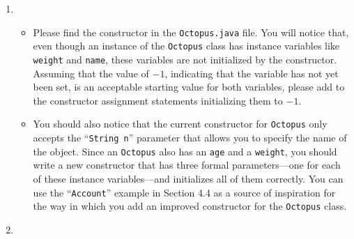 \begin{enumerate}
\item

\begin{itemize}


  \item Please find the constructor in the {\tt Octopus.java} file.  You will notice that, even though an
    instance of the {\tt Octopus} class has instance variables like {\tt weight} and {\tt name}, these variables are not
    initialized by the constructor. Assuming that the value of $-1$, indicating that the variable has not yet been set,
    is an acceptable starting value for both variables, please add to the constructor assignment statements initializing
    them to $-1$.


  \item You should also notice that the current constructor for {\tt Octopus} only accepts the ``{\tt String n}''
    parameter that allows you to specify the name of the object.  Since an {\tt Octopus} also has an {\tt age} and a
    {\tt weight}, you should write a new constructor that has three formal parameters---one for each of these instance
    variables---and initializes all of them correctly. You can use the ``{\tt Account}'' example in Section 4.4 as a
    source of inspiration for the way in which you add an improved constructor for the {\tt Octopus} class.

\end{itemize}


\item
\begin{itemize}


\end{itemize}
\end{enumerate}
